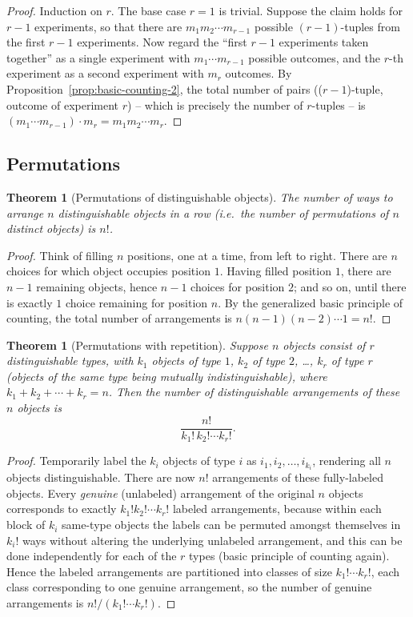 \documentclass[11pt]{article}
\theoremstyle{definition}
\theoremstyle{plain}
\newtheorem{theorem}[definition]{Theorem}
\theoremstyle{remark}
\begin{document}
\begin{proof}
Induction on $r$. The base case $r=1$ is trivial. Suppose the claim holds for $r-1$ experiments,
so that there are $m_1 m_2 \cdots m_{r-1}$ possible $(r-1)$-tuples from the first $r-1$
experiments. Now regard the ``first $r-1$ experiments taken together'' as a single experiment
with $m_1 \cdots m_{r-1}$ possible outcomes, and the $r$-th experiment as a second experiment
with $m_r$ outcomes. By Proposition~\ref{prop:basic-counting-2}, the total number of pairs
(($r-1$)-tuple, outcome of experiment $r$) -- which is precisely the number of $r$-tuples -- is
$(m_1 \cdots m_{r-1}) \cdot m_r = m_1 m_2 \cdots m_r$.
\end{proof}

\subsection{Permutations}

\begin{theorem}[Permutations of distinguishable objects]
The number of ways to arrange $n$ distinguishable objects in a row (i.e.\ the number of
permutations of $n$ distinct objects) is $n!$.
\end{theorem}

\begin{proof}
Think of filling $n$ positions, one at a time, from left to right. There are $n$ choices for
which object occupies position $1$. Having filled position $1$, there are $n-1$ remaining objects,
hence $n-1$ choices for position $2$; and so on, until there is exactly $1$ choice remaining for
position $n$. By the generalized basic principle of counting, the total number of arrangements is
$n(n-1)(n-2)\cdots 1 = n!$.
\end{proof}

\begin{theorem}[Permutations with repetition]
\label{thm:perm-repetition}
Suppose $n$ objects consist of $r$ distinguishable \emph{types}, with $k_1$ objects of type $1$,
$k_2$ of type $2$, \dots, $k_r$ of type $r$ (objects of the same type being mutually
indistinguishable), where $k_1 + k_2 + \cdots + k_r = n$. Then the number of distinguishable
arrangements of these $n$ objects is
\[
\frac{n!}{k_1!\,k_2! \cdots k_r!}.
\]
\end{theorem}

\begin{proof}
Temporarily label the $k_i$ objects of type $i$ as $i_1, i_2, \dots, i_{k_i}$, rendering all $n$
objects distinguishable. There are now $n!$ arrangements of these fully-labeled objects. Every
\emph{genuine} (unlabeled) arrangement of the original $n$ objects corresponds to exactly
$k_1! k_2! \cdots k_r!$ labeled arrangements, because within each block of $k_i$ same-type objects
the labels can be permuted amongst themselves in $k_i!$ ways without altering the underlying
unlabeled arrangement, and this can be done independently for each of the $r$ types (basic
principle of counting again). Hence the labeled arrangements are partitioned into classes of size
$k_1!\cdots k_r!$, each class corresponding to one genuine arrangement, so the number of genuine
arrangements is $n! / (k_1! \cdots k_r!)$.
\end{proof}
\end{document}
